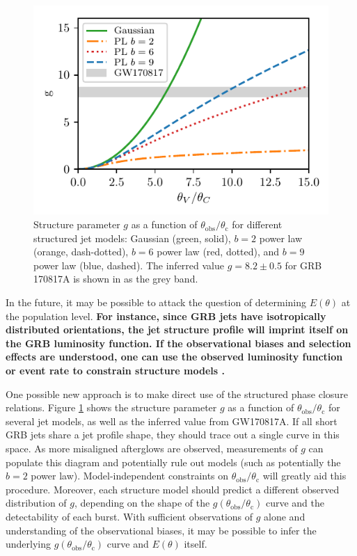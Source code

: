 \documentclass[twocolumn]{aastex62}
\newcommand{\gwbns}{GW170817A}
\newcommand{\grbbns}{GRB 170817A}
\newcommand{\thobs}{\ensuremath{\theta_{\mathrm{obs}}}}
\newcommand{\thC}{\ensuremath{\theta_{\mathrm{c}}}}
\begin{document}
\begin{figure}
	\includegraphics[width=\columnwidth]{figs/g_plot.pdf}
	\caption{Structure parameter $g$ as a function of $\thobs/\thC$ for different structured jet models: Gaussian (green, solid), $b=2$ power law (orange, dash-dotted), $b=6$ power law (red, dotted), and $b=9$ power law (blue, dashed).  The inferred value $g = 8.2\pm0.5$ for \grbbns{} is shown in as the grey band. \label{fig:gPop}}
\end{figure}

 In the future, it may be possible to attack the question of determining $E(\theta)$ at the population level. {\bf For instance, since GRB jets have isotropically distributed orientations, the jet structure profile will imprint itself on the GRB luminosity function.  If the observational biases and selection effects are understood, one can use the observed luminosity function or event rate to constrain structure models \citep{Beniamini:2019aa, Beniamini:2019ab}.  }

One possible new approach is to make direct use of the structured phase closure relations.  Figure \ref{fig:gPop} shows the structure parameter $g$ as a function of $\thobs/\thC$ for several jet models, as well as the inferred value from \gwbns{}.  If all short GRB jets share a jet profile shape, they should trace out a single curve in this space.  As more misaligned afterglows are observed, measurements of $g$ can populate this diagram and potentially rule out models (such as potentially the $b=2$ power law).  Model-independent constraints on $\thobs/\thC$ will greatly aid this procedure.  Moreover, each structure model should predict a different observed distribution of $g$, depending on the shape of the $g(\thobs/\thC)$ curve and the detectability of each burst.  With sufficient observations of $g$ alone and understanding of the observational biases, it may be possible to infer the underlying $g(\thobs/\thC)$ curve and $E(\theta)$ itself.
\end{document}
